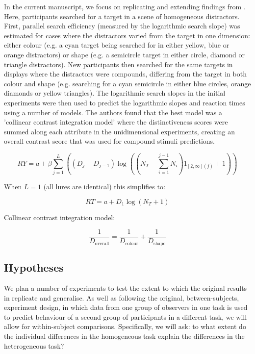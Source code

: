 \documentclass[smallextended]{svjour3}       %
\begin{document}
In the current manuscript, we focus on replicating and extending findings from \cite{buetti2019predicting}. Here, participants searched for a target in a scene of homogeneous distractors. First, parallel search efficiency (measured by the logarithmic search slope) was estimated for cases where the distractors varied from the target in one dimension: either colour (e.g. a cyan target being searched for in either yellow, blue or orange distractors) or shape (e.g. a semicircle target in either circle, diamond or triangle distractors). New participants then searched for the same targets in displays where the distractors were compounds, differing from the target in both colour and shape (e.g. searching for a cyan semicircle in either blue circles, orange diamonds or yellow triangles). The logarithmic search slopes in the initial experiments were then used to predict the logarithmic slopes and reaction times using a number of models. The authors found that the best model was a 'collinear contrast integration model' where the distinctiveness scores were summed along each attribute in the unidimensional experiments, creating an overall contrast score that was used for compound stimuli predictions.

\begin{equation}
RY = a + \beta\sum_{j=1}^L\left((D_j - D_{j-1})\log\left(\left(N_T - \sum_{i=1}^{j-1}N_i\right)1_{[2,\infty](j)}+1 \right)\right)
\label{eq:buetti2019}
\end{equation}

When $L=1$ (all lures are identical) this simplifies to:

\begin{equation}
RT = a + D_1\log(N_T+1)
\end{equation}

Collinear contrast integration model:

\begin{equation}
\frac{1}{D_\text{overall}} = \frac{1}{D_\text{colour}} + \frac{1}{D_\text{shape}}
\label{eq:collinearcontrast}
\end{equation}

\subsection{Hypotheses}

We plan a number of experiments to test the extent to which the original results in \cite{buetti2019predicting} replicate and generalise. As well as following the original, between-subjects, experiment design, in which data from one group of observers in one task is used to predict behaviour of a second group of participants in a different task, we will allow for within-subject comparisons. Specifically, we will ask: to what extent do the individual differences in the homogeneous task explain the differences in the heterogeneous task? 
\end{document}
